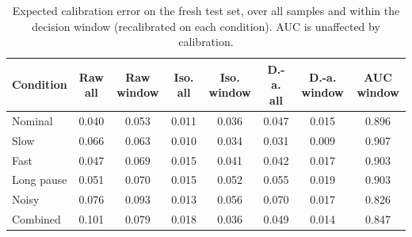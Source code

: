 \begin{table}[t]
\centering
\caption{Expected calibration error on the fresh test set, over all samples and within the decision window (recalibrated on each condition). AUC is unaffected by calibration.}
\label{tab:calibration}
\begin{tabular}{lccccccc}
\toprule
Condition & Raw all & Raw window & Iso. all & Iso. window & D.-a. all & D.-a. window & AUC window \\
\midrule
Nominal & 0.040 & 0.053 & 0.011 & 0.036 & 0.047 & 0.015 & 0.896 \\
Slow & 0.066 & 0.063 & 0.010 & 0.034 & 0.031 & 0.009 & 0.907 \\
Fast & 0.047 & 0.069 & 0.015 & 0.041 & 0.042 & 0.017 & 0.903 \\
Long pause & 0.051 & 0.070 & 0.015 & 0.052 & 0.055 & 0.019 & 0.903 \\
Noisy & 0.076 & 0.093 & 0.013 & 0.056 & 0.070 & 0.017 & 0.826 \\
Combined & 0.101 & 0.079 & 0.018 & 0.036 & 0.049 & 0.014 & 0.847 \\
\bottomrule
\end{tabular}
\end{table}
